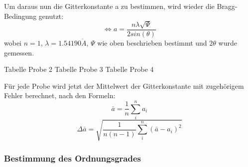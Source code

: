             Um daraus nun die Gitterkonstante a zu bestimmen, wird wieder die Bragg-Bedingung genutzt:
            \begin{equation}
                \Leftrightarrow a = \frac{n \lambda \sqrt{\Psi}}{2 sin(\theta)}
            \end{equation}
            wobei $n=1$, $\lambda = 1.54190 \mathring{A}$, $\Psi$ wie oben beschrieben bestimmt und $2 \theta$ wurde gemessen.

            Tabelle Probe 2
            Tabelle Probe 3
            Tabelle Probe 4

            Für jede Probe wird jetzt der Mittelwert der Gitterkonstante mit zugehörigem
            Fehler berechnet, nach den Formeln:
            \begin{equation}
                \bar{a} = \frac{1}{n} \sum^n_i a_i
            \end{equation}
            \begin{equation}
                \Delta \bar{a} = \sqrt{\frac{1}{n(n-1)} \sum^n_i (\bar{a}-a_i)^2}
            \end{equation}  

            \subsubsection{Bestimmung des Ordnungsgrades}

